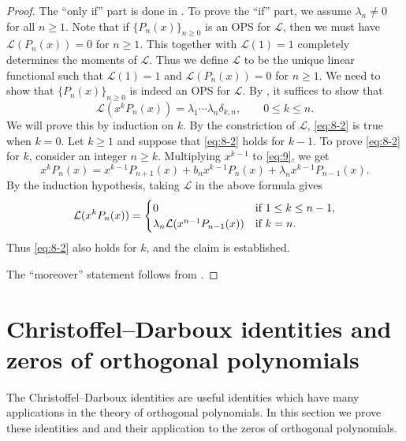 \documentclass[oneside]{book}
\numberwithin{equation}{section}
\theoremstyle{definition}
\newcommand\LL{\mathcal{L}}
\begin{document}
\begin{proof}
  The ``only if'' part is done in . To prove the ``if''
  part, we assume \( \lambda_n\ne 0 \) for all \( n\ge1 \). Note that
  if \( \{ P_n(x) \}_{n\ge 0} \) is an OPS for \( \LL \), then we must
  have \( \LL(P_n(x)) = 0 \) for \( n\ge1 \). This together with
  \( \LL(1) = 1 \) completely determines the moments of \( \LL \).
  Thus we define \( \LL \) to be the unique linear functional such
  that \( \LL(1) = 1 \) and \( \LL(P_n(x)) = 0 \) for \( n\ge1 \). We
  need to show that \( \{ P_n(x) \}_{n\ge 0} \) is indeed an OPS for
  \( \LL \). By , it suffices to show that
  \begin{equation}\label{eq:8-2}
    \LL(x^k P_n(x)) = \lambda_1 \cdots \lambda_n \delta_{k,n}, \qquad 0\le k\le n.
  \end{equation}
  We will prove this by induction on \( k \). By the
  constriction of \( \LL \), \eqref{eq:8-2} is true when \( k=0 \).
  Let \( k\ge1 \) and suppose that \eqref{eq:8-2} holds for \( k-1 \).
  To prove \eqref{eq:8-2} for \( k \), consider an integer
  \( n\ge k \). Multiplying \( x^{k-1} \) to \eqref{eq:9}, we get
  \[
    x^k P_n(x) = x^{k-1} P_{n+1}(x) + b_n x^{k-1}P_n(x)  + \lambda_n x^{k-1} P_{n-1}(x).
  \]
  By the induction hypothesis, taking \( \LL \) in the above formula
  gives
  \[
    \LL(x^k P_n(x)) =
    \begin{cases}
     0 & \mbox{if \( 1\le k\le n-1 \)},\\
     \lambda_n \LL(x^{n-1} P_{n-1}(x)) & \mbox{if \( k=n \).}
    \end{cases}
  \]
  Thus \eqref{eq:8-2} also holds for \( k \), and the claim is
  established.

  The ``moreover'' statement follows from .
\end{proof}

\section{Christoffel--Darboux identities
and zeros of orthogonal polynomials}

The Christoffel--Darboux identities are useful identities which have
many applications in the theory of orthogonal polynomials. In this
section we prove these identities and and their application to the
zeros of orthogonal polynomials.
\end{document}
